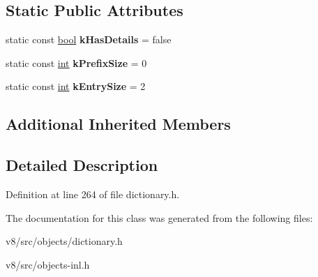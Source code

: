 \subsection*{Static Public Attributes}
\begin{DoxyCompactItemize}
\item 
\mbox{\label{classv8_1_1internal_1_1SimpleNumberDictionaryShape_a1ddb9875bff6a20034c99acc689fae18}} 
static const \mbox{\hyperlink{classbool}{bool}} {\bfseries k\+Has\+Details} = false
\item 
\mbox{\label{classv8_1_1internal_1_1SimpleNumberDictionaryShape_afa984b1bc003916f6a6c8a917590599c}} 
static const \mbox{\hyperlink{classint}{int}} {\bfseries k\+Prefix\+Size} = 0
\item 
\mbox{\label{classv8_1_1internal_1_1SimpleNumberDictionaryShape_aa1d72e3ac2303921f7f1e3ef659d3f57}} 
static const \mbox{\hyperlink{classint}{int}} {\bfseries k\+Entry\+Size} = 2
\end{DoxyCompactItemize}
\subsection*{Additional Inherited Members}


\subsection{Detailed Description}


Definition at line 264 of file dictionary.\+h.



The documentation for this class was generated from the following files\+:\begin{DoxyCompactItemize}
\item 
v8/src/objects/dictionary.\+h\item 
v8/src/objects-\/inl.\+h\end{DoxyCompactItemize}
